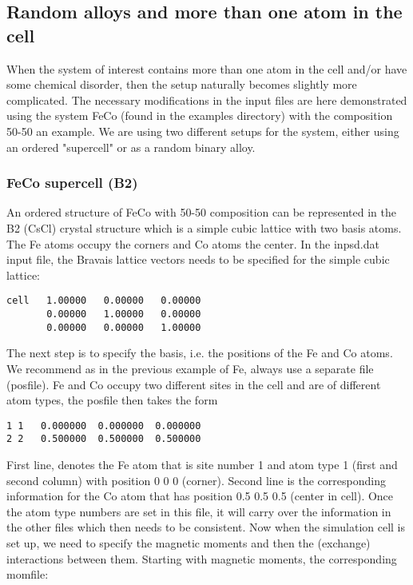 \documentclass[11pt,fleqn,a4]{book} %
\begin{document}
\subsection{Random alloys and more than one atom in the cell}
When the system of interest contains more than one atom in the cell and/or have some chemical disorder, then the setup naturally becomes slightly more complicated. The necessary modifications in the input files are here demonstrated using the system FeCo (found in the examples directory) with the composition 50-50 an example.  We are using two different setups for the system, either using an ordered "supercell" or as a random binary alloy. 

\subsubsection{FeCo supercell (B2)} 
An ordered structure of FeCo with 50-50 composition can be represented in the B2 (CsCl) crystal structure which is a simple cubic lattice with two basis atoms. The Fe atoms occupy the corners and Co atoms the center. In the inpsd.dat input file, the Bravais lattice vectors needs to be specified for the simple cubic lattice:

\begin{fBox} 
\begin{Verbatim}
cell   1.00000   0.00000   0.00000         
       0.00000   1.00000   0.00000
       0.00000   0.00000   1.00000
\end{Verbatim}
\end{fBox}

The next step is to specify the basis, i.e. the positions of the Fe and Co atoms. We recommend as in the previous example of Fe, always use a separate file (posfile). Fe and Co occupy two different sites in the cell and are of different atom types, the posfile then takes the form
 
\begin{fBox} 
\begin{Verbatim}
1 1   0.000000  0.000000  0.000000
2 2   0.500000  0.500000  0.500000
\end{Verbatim}
\end{fBox}

First line, denotes the Fe atom that is site number 1 and atom type 1 (first and second column) with position 0 0 0 (corner). Second line is the corresponding information for the Co atom that has position 0.5 0.5 0.5 (center in cell).  Once the atom type numbers are set in this file, it will carry over the information in the other files which then needs to be consistent. Now when the simulation cell is set up, we need to specify the magnetic moments and then the (exchange) interactions between them. Starting with magnetic moments, the corresponding momfile:
\end{document}
